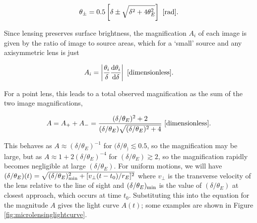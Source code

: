 \documentclass[a4paper,10pt]{article}
\begin{document}
\begin{align*}
    \theta_\pm = 0.5 \left[\delta\pm\sqrt{\delta^2+4\theta_E^2}\right] ~ [{\rm rad}].
\end{align*}

{\noindent}Since lensing preserves surface brightness, the magnification $A_i$ of each image is given by the ratio of image to source areas, which for a `small' source and any axisymmetric lens is just

\begin{align*}
    A_i = \left\lvert \frac{\theta_i}{\delta}\frac{{\rm d}\theta_i}{{\rm d}\delta} \right\rvert ~ [{\rm dimensionless}].
\end{align*}

{\noindent}For a point lens, this leads to a total observed magnification as the sum of the two image magnifications,

\begin{align*}
    A = A_+ + A_- = \frac{(\delta/\theta_E)^2+2}{(\delta/\theta_E)\sqrt{(\delta/\theta_E)^2+4}} ~ [{\rm dimensionless}].
\end{align*}

{\noindent}This behaves as $A\approx(\delta/\theta_E)^{-1}$ for $(\delta/\theta_)\lesssim0.5$, so the magnification may be large, but as $A\approx1+2(\delta/\theta_E)^{-4}$ for $(\delta/\theta_E)\gtrsim2$, so the magnification rapidly becomes negligible at large $(\delta/\theta_E)$. For uniform motions, we will have $(\delta/\theta_E)(t) = \sqrt{(\delta/\theta_E)_{\rm min}^2 + [v_\perp(t-t_0)/r_E]^2}$ where $v_\perp$ is the transverse velocity of the lens relative to the line of sight and $(\delta/\theta_E)_{\rm min}$ is the value of $(\delta/\theta_E)$ at closest approach, which occurs at time $t_0$. Substituting this into the equation for the magnitude $A$ gives the light curve $A(t)$; some examples are shown in Figure \ref{fig:microlensinglightcurve}.
\end{document}

